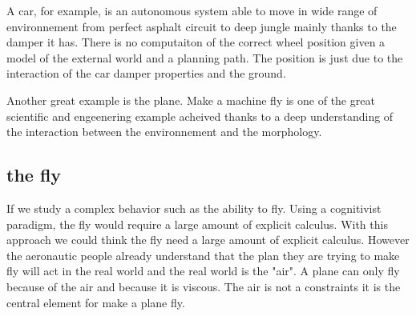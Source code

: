 A car, for example, is an autonomous system able to move in wide range of environnement from perfect asphalt circuit to deep jungle mainly thanks to the damper it has. There is no computaiton of the correct wheel position given a model of the external world and a planning path. The position is just due to the interaction of the car damper properties and the ground.

Another great example is the plane. Make a machine fly is one of the great scientific and engeenering example acheived thanks to a deep understanding of the interaction between the environnement and the morphology.





\subsection{the fly} %

If we study a complex behavior such as the ability to fly. Using a cognitivist paradigm, the fly would require a large amount of explicit calculus.  With this approach we could think the fly need a large amount of explicit calculus. However the aeronautic people already understand that the plan they are trying to make fly will act in the real world and the real world is the "air". A plane can only fly because of the air and because it is viscous. The air is not a constraints it is the central element for make a plane fly.


